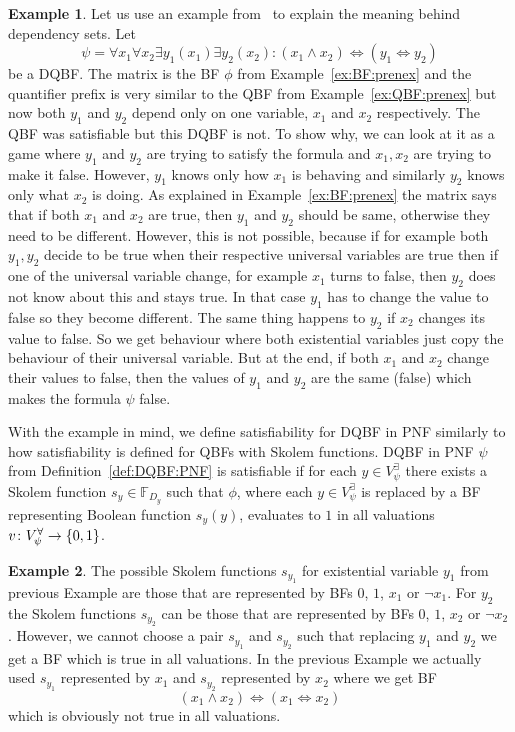 \documentclass[
  digital, %
  twoside, %
  table,   %
  nolof,     %
  nolot,     %
]{fithesis3}
\let\setbuilder\set
\newcommand{\simpleset}[1]{\{{#1}\}}
\renewcommand{\set}[1]{\normalexpandarg\IfSubStr{#1}{|}{\setbuilder{#1}}{\simpleset{#1}}}
\theoremstyle{definition}
\newtheorem{example}{Example}
\theoremstyle{remark}
\newcommand{\BFuncs}[1]{\mathbb{F}_{#1}}
\newcommand{\evars}[1]{V_{#1}^{\exists}}
\newcommand{\uvars}[1]{V_{#1}^{\forall}}
\newcommand{\lequal}{\Leftrightarrow}
\begin{document}
\begin{example}
Let us use an example from~\cite{DQBFProofSystem} to explain the meaning behind dependency sets. Let 
\[\psi = \forall x_1 \forall x_2 \exists y_1 (x_1) \exists y_2 (x_2) : (x_1 \land x_2) \lequal (y_1 \lequal y_2)\]
be a DQBF. The matrix is the BF $\phi$ from Example~\ref{ex:BF:prenex} and the quantifier prefix is very similar to the QBF from Example~\ref{ex:QBF:prenex} but now both $y_1$ and $y_2$ depend only on one variable, $x_1$ and $x_2$ respectively. The QBF was satisfiable but this DQBF is not. To show why, we can look at it as a game where $y_1$  and $y_2$ are trying to satisfy the formula and $x_1,x_2$ are trying to make it false. However, $y_1$ knows only how $x_1$ is behaving and similarly $y_2$ knows only what $x_2$ is doing. As explained in Example~\ref{ex:BF:prenex} the matrix says that if both $x_1$ and $x_2$ are true, then $y_1$ and $y_2$ should be same, otherwise they need to be different. However, this is not possible, because if for example both $y_1,y_2$ decide to be true when their respective universal variables are true then if one of the universal variable change, for example $x_1$ turns to false, then $y_2$ does not know about this and stays true. In that case $y_1$ has to change the value to false so they become different. The same thing happens to $y_2$ if $x_2$ changes its value to false. So we get behaviour where both existential variables just copy the behaviour of their universal variable. But at the end, if both $x_1$ and $x_2$ change their values to false, then the values of $y_1$ and $y_2$ are the same (false) which makes the formula $\psi$ false.
\end{example}

With the example in mind, we define satisfiability for DQBF in PNF similarly to how satisfiability is defined for QBFs with Skolem functions. DQBF in PNF $\psi$ from Definition~\ref{def:DQBF:PNF} is satisfiable if for each $y \in \evars{\psi}$ there exists a Skolem function $s_y \in \BFuncs{D_y}$ such that $\phi$, where each $y \in \evars{\psi}$ is replaced by a BF representing Boolean function $s_y(y)$, evaluates to $1$ in all valuations $v\colon \uvars{\psi} \to \set{0,1}$.

\begin{example}
The possible Skolem functions $s_{y_1}$ for existential variable $y_1$ from previous Example are those that are represented by BFs $0$, $1$, $x_1$ or $\neg x_1$. For $y_2$ the Skolem functions $s_{y_2}$ can be those that are represented by BFs $0$, $1$, $x_2$ or $\neg x_2$. However, we cannot choose a pair $s_{y_1}$ and $s_{y_2}$ such that replacing $y_1$ and $y_2$ we get a BF which is true in all valuations. In the previous Example we actually used $s_{y_1}$ represented by $x_1$ and $s_{y_2}$ represented by $x_2$ where we get BF
\[(x_1 \land x_2) \lequal (x_1 \lequal x_2)\]
which is obviously not true in all valuations.
\end{example}
\end{document}
